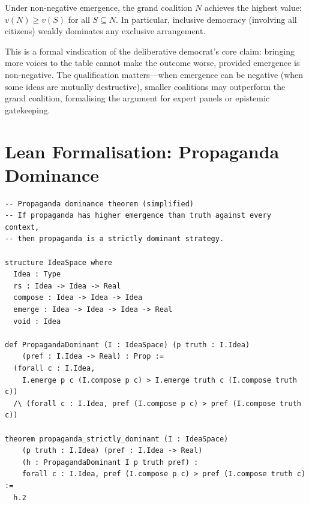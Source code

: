 \begin{corollary}
\label{cor:grand-coalition-political}
Under non-negative emergence, the grand coalition $N$ achieves
the highest value: $v(N) \ge v(S)$ for all $S \subseteq N$.
In particular, inclusive democracy (involving all citizens)
weakly dominates any exclusive arrangement.
\end{corollary}

\begin{interpretation}
This is a formal vindication of the deliberative democrat's
core claim: bringing more voices to the table cannot make the
outcome worse, provided emergence is non-negative.  The
qualification matters---when emergence can be negative (when
some ideas are mutually destructive), smaller coalitions may
outperform the grand coalition, formalising the argument for
expert panels or epistemic gatekeeping.
\end{interpretation}

\section{Lean Formalisation: Propaganda Dominance}
\label{sec:political-lean}

\begin{lstlisting}[caption={Propaganda dominance in Lean 4},label={lst:propaganda}]
-- Propaganda dominance theorem (simplified)
-- If propaganda has higher emergence than truth against every context,
-- then propaganda is a strictly dominant strategy.

structure IdeaSpace where
  Idea : Type
  rs : Idea -> Idea -> Real
  compose : Idea -> Idea -> Idea
  emerge : Idea -> Idea -> Idea -> Real
  void : Idea

def PropagandaDominant (I : IdeaSpace) (p truth : I.Idea)
    (pref : I.Idea -> Real) : Prop :=
  (forall c : I.Idea,
    I.emerge p c (I.compose p c) > I.emerge truth c (I.compose truth c))
  /\ (forall c : I.Idea, pref (I.compose p c) > pref (I.compose truth c))

theorem propaganda_strictly_dominant (I : IdeaSpace)
    (p truth : I.Idea) (pref : I.Idea -> Real)
    (h : PropagandaDominant I p truth pref) :
    forall c : I.Idea, pref (I.compose p c) > pref (I.compose truth c) :=
  h.2
\end{lstlisting}




